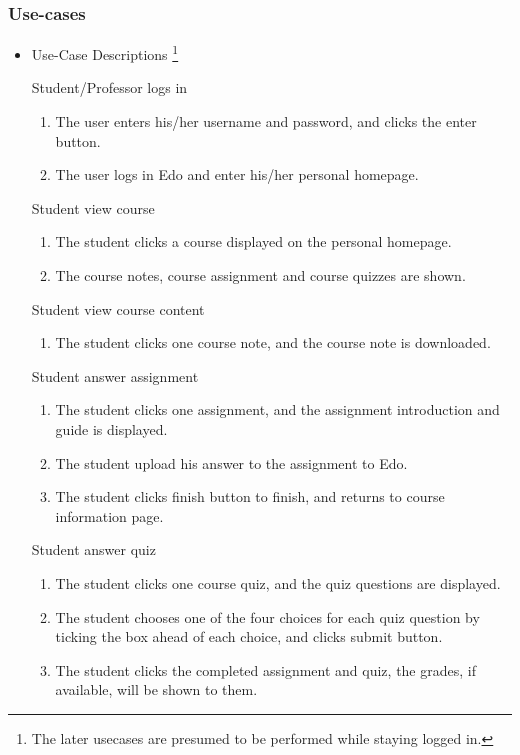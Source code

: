 \documentclass[paper=a4, fontsize=11pt]{scrartcl}
\numberwithin{equation}{section}		%
\numberwithin{figure}{section}			%
\numberwithin{table}{section}				%
\begin{document}
\subsubsection{Use-cases}
\begin{itemize}
	\item Use-Case Descriptions \footnote{The later usecases are presumed to be performed while staying logged in.}
	\par Student/Professor logs in
	\begin{enumerate}
		\item The user enters his/her username and password, and clicks the enter button.
		\item The user logs in Edo and enter his/her personal homepage.
	\end{enumerate}
	\par Student view course
	\begin{enumerate}
		\item The student clicks a course displayed on the personal homepage.
		\item The course notes, course assignment and course quizzes are shown.
	\end{enumerate}
	\par Student view course content
	\begin{enumerate}
		\item The student clicks one course note, and the course note is downloaded.
	\end{enumerate}
	\par Student answer assignment
	\begin{enumerate}
		\item The student clicks one assignment, and the assignment introduction and guide is displayed.
		\item The student upload his answer to the assignment to Edo.
		\item The student clicks finish button to finish, and returns to course information page.
	\end{enumerate}
	\par Student answer quiz
	\begin{enumerate}
		\item The student clicks one course quiz, and the quiz questions are displayed.
		\item The student chooses one of the four choices for each quiz question by ticking the box ahead of each choice, and clicks submit button.
		\item The student clicks the completed assignment and quiz, the grades, if available, will be shown to them. 

\end{enumerate}
\end{itemize}
\end{document}
